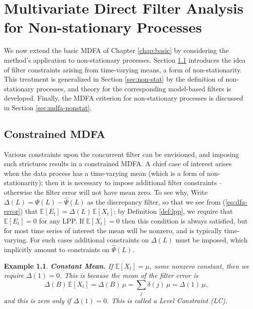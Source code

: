 \documentclass[a4paper]{book}
\def\EE{\mathbb E}
\newtheorem{Example}{Example}
\begin{document}




\chapter{Multivariate Direct Filter Analysis for Non-stationary Processes}
\label{chap:int}

 We now extend the basic MDFA of Chapter \ref{chap:basic}  by considering
 the method's application to  non-stationary processes.  
 Section \ref{sec:constraint} introduces the idea of filter constraints
arising from time-varying means, a form of non-stationarity.
 This treatment is generalized in Section \ref{sec:non-stat}
  by the definition of non-stationary processes, and theory for the corresponding
   model-based filters is developed.  Finally, the MDFA criterion for
    non-stationary processes is discussed in Section \ref{sec:mdfa-nonstat}.
 

\section{Constrained MDFA}
\label{sec:constraint}

 Various constraints upon the concurrent filter can be envisioned, 
   and imposing such strictures results in  a constrained MDFA. 
   A chief case of interest arises when the 
    data process has a time-varying mean (which is a form of  non-stationarity);
  then it is necessary to impose additional filter constraints -- otherwise
   the filter error will not have mean zero.    To see why, 
   Write $\Delta (L) = \Psi (L) - \widehat{\Psi} (L)$ as the discrepancy filter,
   so that we see  from (\ref{eq:dfa-error})  
   that $\EE [ E_t ] = \Delta (L) \, \EE [ X_t ]$; 
   by Definition \ref{def:lpp}, we require
 that $\EE [ E_t ] = 0$ for any LPP.  
  If $\EE [ X_t] = 0$ then this condition is always satisfied, but
   for most time series of interest the mean will be nonzero, and is typically
    time-varying.  For such cases additional constraints on $\Delta (L)$ must be imposed,
    which implicitly amount to constraints on $\widehat{\Psi} (L)$.
    
\begin{Example}    {\bf Constant Mean.}  \rm
\label{exam:constant.mean}
  If $\EE [ X_t ] = \mu$, some nonzero constant,  then we require $\Delta (1) = 0$.
  This is because the mean of the filter error is
  \[
   \Delta (B) \, \EE [ X_t] = \Delta(B) \, \mu = \sum_j \delta (j) \, \mu =
   \Delta (1) \, \mu,
  \]
  and this is zero only if $\Delta (1) = 0$.  This is called a Level Constraint (LC).
\end{Example}  
\end{document}
